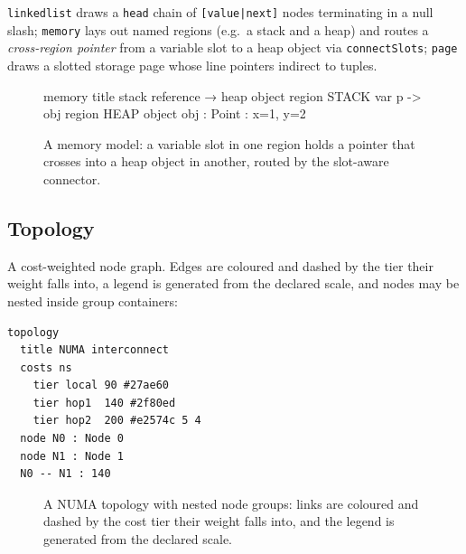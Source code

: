 \texttt{linkedlist} draws a \texttt{head} chain of \texttt{[value|next]} nodes
terminating in a null slash; \texttt{memory} lays out named regions (e.g.\ a stack
and a heap) and routes a \emph{cross-region pointer} from a variable slot to a heap
object via \texttt{connectSlots}; \texttt{page} draws a slotted storage page whose
line pointers indirect to tuples.

\begin{figure}[htbp]
  \centering
\begin{triton}
memory
  title stack reference → heap object
  region STACK
    var p -> obj
  region HEAP
    object obj : Point : x=1, y=2
\end{triton}
  \caption{A memory model: a variable slot in one region holds a
pointer that crosses into a heap object in another, routed by the slot-aware
connector.}
\end{figure}

\subsection{Topology}

A cost-weighted node graph. Edges are coloured and dashed by the tier their weight
falls into, a legend is generated from the declared scale, and nodes may be nested
inside group containers:

\begin{lstlisting}[language=triton]
topology
  title NUMA interconnect
  costs ns
    tier local 90 #27ae60
    tier hop1  140 #2f80ed
    tier hop2  200 #e2574c 5 4
  node N0 : Node 0
  node N1 : Node 1
  N0 -- N1 : 140
\end{lstlisting}

\begin{figure}[htbp]
  \centering
{}
  \caption{A NUMA topology with nested node groups: links are coloured and
dashed by the cost tier their weight falls into, and the legend is generated from
the declared scale.}
\end{figure}
